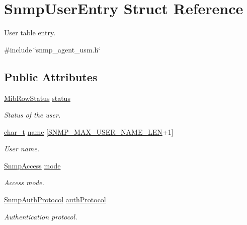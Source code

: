 \hypertarget{structSnmpUserEntry}{}\section{Snmp\+User\+Entry Struct Reference}
\label{structSnmpUserEntry}


User table entry.  




{\ttfamily \#include \char`\"{}snmp\+\_\+agent\+\_\+usm.\+h\char`\"{}}

\subsection*{Public Attributes}
\begin{DoxyCompactItemize}
\item 
\hyperlink{mib__common_8h_a40ce1ea958f5c3b04f841d76f5557097}{Mib\+Row\+Status} \hyperlink{structSnmpUserEntry_add2c8c54d828652fa85a0697654e0573}{status}
\begin{DoxyCompactList}\small\item\em Status of the user. \end{DoxyCompactList}\item 
\hyperlink{compiler__port_8h_a40bb5262bf908c328fbcfbe5d29d0201}{char\+\_\+t} \hyperlink{structSnmpUserEntry_a60ae402e93fecec705e4f7ff0755360f}{name} \mbox{[}\hyperlink{snmp__common_8h_ae889f56d8038ef202bca4b1d974bd53f}{S\+N\+M\+P\+\_\+\+M\+A\+X\+\_\+\+U\+S\+E\+R\+\_\+\+N\+A\+M\+E\+\_\+\+L\+EN}+1\mbox{]}
\begin{DoxyCompactList}\small\item\em User name. \end{DoxyCompactList}\item 
\hyperlink{snmp__agent__usm_8h_a45fe7ae59b303bb7c3a6067ffe2ed5ca}{Snmp\+Access} \hyperlink{structSnmpUserEntry_af0824f5ebfa463d31b6d9983def956eb}{mode}
\begin{DoxyCompactList}\small\item\em Access mode. \end{DoxyCompactList}\item 
\hyperlink{snmp__agent__usm_8h_a13c46b84c881bd15bad7093a7f3639e3}{Snmp\+Auth\+Protocol} \hyperlink{structSnmpUserEntry_a5131eefca59001108b44e59b284397db}{auth\+Protocol}
\begin{DoxyCompactList}\small\item\em Authentication protocol. \end{DoxyCompactList}\item 

\end{DoxyCompactItemize}
